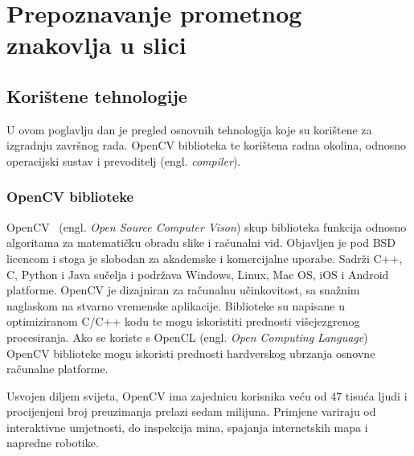 \newpage
\setcounter{figure}{0}

\section{Prepoznavanje prometnog znakovlja u slici} %
\label{sec:Tehnologija i teorija}

\subsection{Korištene tehnologije}
U ovom poglavlju dan je pregled osnovnih tehnologija koje su korištene za izgradnju završnog rada. OpenCV biblioteka te korištena radna okolina, odnosno operacijski sustav i prevoditelj (engl. \textit{compiler}).

\subsubsection{OpenCV biblioteke} %
\label{sub:Biblioteka OpenCV}

OpenCV~\cite{opencv_library} (engl. \textit{Open Source Computer Vison})
skup biblioteka funkcija odnosno algoritama za matematičku obradu slike i
računalni vid.  Objavljen je pod BSD licencom i stoga je slobodan za
akademske i komercijalne uporabe. Sadrži C++, C, Python i Java sučelja i
podržava Windows, Linux, Mac OS, iOS i Android platforme. OpenCV je
dizajniran za računalnu učinkovitost, sa snažnim naglaskom na stvarno
vremenske aplikacije. Biblioteke su napisane u optimiziranom C/C++ kodu
te mogu iskoristiti prednosti višejezgrenog procesiranja. Ako se koriste
s OpenCL (engl. \textit{Open Computing Language}) OpenCV biblioteke 
mogu iskoristi prednosti hardverskog ubrzanja osnovne računalne
platforme.

Usvojen diljem svijeta, OpenCV ima zajednicu korisnika veću od 47 tisuća
ljudi i procijenjeni broj preuzimanja prelazi sedam milijuna. Primjene
variraju od interaktivne umjetnosti, do inspekcija mina, spajanja
internetskih mapa i napredne robotike.

